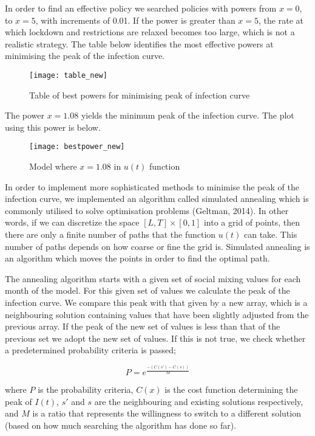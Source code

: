 \documentclass[10pt]{article}
\begin{document}
In order to find an effective policy we searched policies with powers from $x=0$, to $x=5$, with increments of 0.01. If the power is greater than $x=5$, the rate at which lockdown and restrictions are relaxed becomes too large, which is not a realistic strategy. The table below identifies the most effective powers at minimising the peak of the infection curve. \newline 

\begin{figure}[H]
\caption{Table of best powers for minimising peak of infection curve}
\centerline{\texttt{[image: table\_new]}}
\end{figure}


The power $x=1.08$ yields the minimum peak of the infection curve. The plot using this power is below.

\begin{figure}[H]
\caption{Model where $x=1.08$ in $u(t)$ function}
\centerline{\texttt{[image: bestpower\_new]}}
\end{figure}

\noindent
In order to implement more sophisticated methods to minimise the peak of the infection curve, we implemented an algorithm called simulated annealing which is commonly utilised to solve optimisation problems (Geltman, 2014). In other words, if we can discretize the space $ [L,T] \times [0,1]$ into a grid of points, then there are only a finite number of paths that the function $u(t)$ can take. This number of paths depends on how coarse or fine the grid is. Simulated annealing is an algorithm which moves the points in order to find the optimal path. \newline

The annealing algorithm starts with a given set of social mixing values for each month of the model. For this given set of values we calculate the peak of the infection curve. We compare this peak with that given by a new array, which is a neighbouring solution containing values that have been slightly adjusted from the previous array. If the peak of the new set of values is less than that of the previous set we adopt the new set of values. If this is not true, we check whether a predetermined probability criteria is passed;

$$P=e^\frac { -(C(s') - C(s)) } {M} $$

where $P$ is the probability criteria, $C(x)$ is the cost function determining the peak of $I(t)$, $s'$ and $s$ are the neighbouring and existing solutions respectively, and $M$ is a ratio that represents the willingness to switch to a different solution (based on how much searching the algorithm has done so far). 
\end{document}
